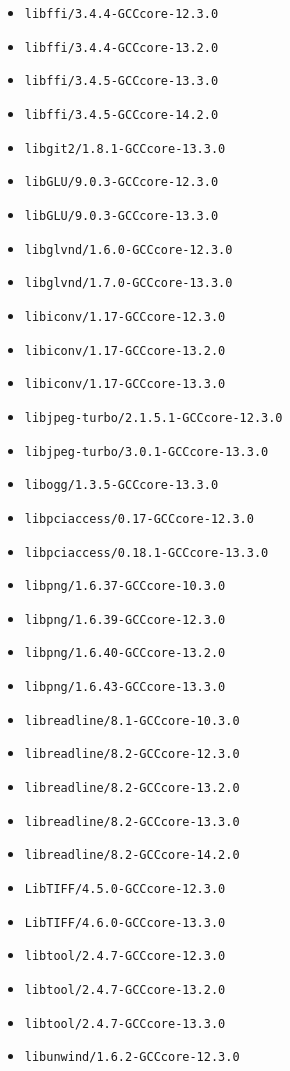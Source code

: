 \begin{multicols}{3}
\begin{itemize}
\item \verb|libffi/3.4.4-GCCcore-12.3.0|
\item \verb|libffi/3.4.4-GCCcore-13.2.0|
\item \verb|libffi/3.4.5-GCCcore-13.3.0|
\item \verb|libffi/3.4.5-GCCcore-14.2.0|
\item \verb|libgit2/1.8.1-GCCcore-13.3.0|
\item \verb|libGLU/9.0.3-GCCcore-12.3.0|
\item \verb|libGLU/9.0.3-GCCcore-13.3.0|
\item \verb|libglvnd/1.6.0-GCCcore-12.3.0|
\item \verb|libglvnd/1.7.0-GCCcore-13.3.0|
\item \verb|libiconv/1.17-GCCcore-12.3.0|
\item \verb|libiconv/1.17-GCCcore-13.2.0|
\item \verb|libiconv/1.17-GCCcore-13.3.0|
\item \verb|libjpeg-turbo/2.1.5.1-GCCcore-12.3.0|
\item \verb|libjpeg-turbo/3.0.1-GCCcore-13.3.0|
\item \verb|libogg/1.3.5-GCCcore-13.3.0|
\item \verb|libpciaccess/0.17-GCCcore-12.3.0|
\item \verb|libpciaccess/0.18.1-GCCcore-13.3.0|
\item \verb|libpng/1.6.37-GCCcore-10.3.0|
\item \verb|libpng/1.6.39-GCCcore-12.3.0|
\item \verb|libpng/1.6.40-GCCcore-13.2.0|
\item \verb|libpng/1.6.43-GCCcore-13.3.0|
\item \verb|libreadline/8.1-GCCcore-10.3.0|
\item \verb|libreadline/8.2-GCCcore-12.3.0|
\item \verb|libreadline/8.2-GCCcore-13.2.0|
\item \verb|libreadline/8.2-GCCcore-13.3.0|
\item \verb|libreadline/8.2-GCCcore-14.2.0|
\item \verb|LibTIFF/4.5.0-GCCcore-12.3.0|
\item \verb|LibTIFF/4.6.0-GCCcore-13.3.0|
\item \verb|libtool/2.4.7-GCCcore-12.3.0|
\item \verb|libtool/2.4.7-GCCcore-13.2.0|
\item \verb|libtool/2.4.7-GCCcore-13.3.0|
\item \verb|libunwind/1.6.2-GCCcore-12.3.0|

\end{itemize}
\end{multicols}
